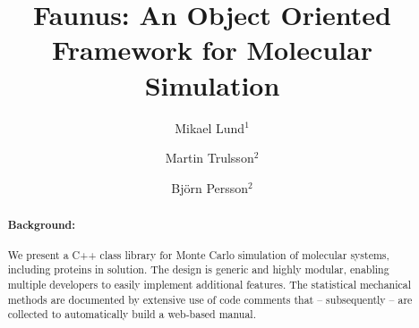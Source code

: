 \documentclass[10pt]{bmc_article}
\newenvironment{bmcformat}{\begin{raggedright}\baselineskip20pt\sloppy\setboolean{publ}{false}}{\end{raggedright}\baselineskip20pt\sloppy}
\begin{document}
\begin{bmcformat}



\title{Faunus: An Object Oriented Framework for Molecular Si\-mu\-la\-tion}
 


\author{
Mikael Lund\correspondingauthor$^{1}$%
\and
Martin Trulsson$^{2}$
\and
Bj\"orn Persson$^{2}$
      }
      

\address{%
    \iid(1) Institute of Organic Chemistry and Biochemistry, The Academy of Sciences of the Czech Republic, Flemingovo nam.2, CZ-16610 Prague 6, Czech Republic.
     \iid(2) Department of Theoretical Chemistry,
     University of Lund, P.O.B 124 SE-22100 Lund, Sweden.
}%
\maketitle

\begin{abstract}
        \paragraph*{Background:} We present a C++ class library for Monte Carlo simulation of molecular systems, including proteins in solution. The design is generic and highly modular, enabling multiple developers to easily implement additional features. The statistical mechanical methods are documented by extensive use of code comments that -- subsequently -- are collected to automatically build a web-based manual.

\end{abstract}
\end{bmcformat}
\end{document}

